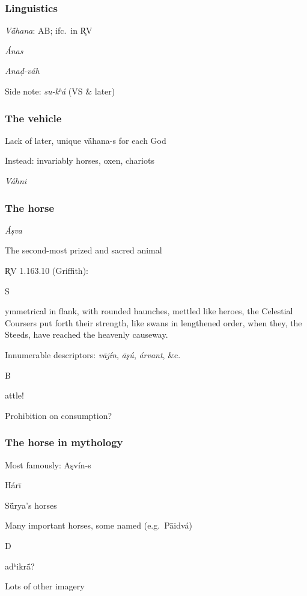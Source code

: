 \documentclass[pdf]{beamer}
\newcommand{\Subitem}[1]{{\setlength\itemindent{12pt} \item[-] #1}}
\begin{document}
\begin{frame} \frametitle{Linguistics}
\begin{itemize}
	\item \textit{Vā́hana}: AB; ifc.~in R̥V
	\item \textit{Ánas}
	\Subitem {\textit{Anaḍ-váh}}
	\item Side note: \textit{su-kʰá} (VS \& later)
\end{itemize}
\end{frame}

\begin{frame} \frametitle{The vehicle}
\begin{itemize}
	\item Lack of later, unique vā́hana-s for each God
	\item Instead: invariably horses, oxen, chariots
	\Subitem {\textit{Váhni}}
\end{itemize}
\end{frame}

\begin{frame} \frametitle{The horse}
\begin{itemize}
	\item \textit{Áşva}
	\item The second-most prized and sacred animal
	\item R̥V 1.163.10 (Griffith):
	\Subitem Symmetrical in flank, with rounded haunches, mettled like heroes, the Celestial Coursers put forth their strength, like swans in lengthened order, when they, the Steeds, have reached the heavenly causeway.
	\item Innumerable descriptors: \textit{vājín}, \textit{āşú}, \textit{árvant}, \&c.
	\Subitem Battle!
	\item Prohibition on consumption?
\end{itemize}
\end{frame}

\begin{frame} \frametitle{The horse in mythology}
\begin{itemize}
	\item Most famously: Aşvín-s
	\item Hárī
	\item Sū́rya's horses
	\item Many important horses, some named (e.g.~Pāidvá)
	\Subitem Dadʰikrā́?
	\item Lots of other imagery
\end{itemize}
\end{frame}
\end{document}
